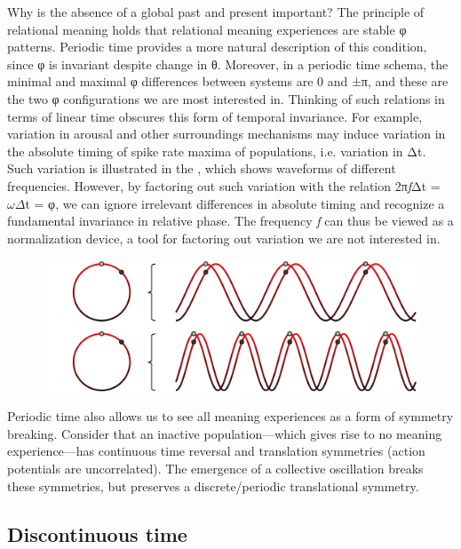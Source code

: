   Why is the absence of a global past and present important? The principle of relational meaning holds that relational meaning experiences are stable φ patterns. Periodic time provides a more natural description of this condition, since φ is invariant despite change in θ. Moreover, in a periodic time schema, the minimal and maximal φ differences between systems are 0 and ±π, and these are the two φ configurations we are most interested in. Thinking of such relations in terms of linear time obscures this form of temporal invariance. For example, variation in arousal and other surroundings mechanisms may induce variation in the absolute timing of spike rate maxima of populations, i.e. variation in Δt. Such variation is illustrated in the {\figurebelow}, which shows waveforms of different frequencies. However, by factoring out such variation with the relation 2π\textit{f}Δt = $\omega \Delta $t = φ, we can ignore irrelevant differences in absolute timing and recognize a fundamental invariance in relative phase. The frequency \textit{f} can thus be viewed as a normalization device, a tool for factoring out variation we are not interested in.

  
\begin{figure}
\includegraphics[width=\textwidth]{figures/Tilsen-img48.png}
\caption{\missingcaption}
\label{fig:}
\end{figure}
 

  Periodic time also allows us to see all meaning experiences as a form of symmetry breaking. Consider that an inactive population—which gives rise to no meaning experience—has continuous time reversal and translation symmetries (action potentials are uncorrelated). The emergence of a collective oscillation breaks these symmetries, but preserves a discrete/periodic translational symmetry.

\subsection{Discontinuous time}

